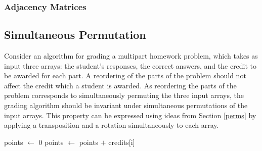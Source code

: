 \documentclass{llncs}
\DeclareMathOperator{\len}{length}
\begin{document}
\subsubsection{Adjacency Matrices}


\subsection{Simultaneous Permutation}

Consider an algorithm for grading a multipart homework problem, which takes as input three arrays:  the student's responses, the correct answers, and the credit to be awarded for each part.  A reordering of the parts of the problem should not affect the credit which a student is awarded.  As reordering the parts of the problem corresponds to simultaneously permuting the three input arrays, the grading algorithm should be invariant under simultaneous permutations of the input arrays.  This property can be expressed using ideas from Section \ref{perms} by applying a transposition and a rotation simultaneously to each array.%
%


\begin{algorithm}
\begin{algorithmic}
\State points \(\gets\) 0
\State points \(\gets\) points \(+\) credits[i]
\EndIf
\EndFor
{}
\EndFunction
\end{algorithmic}
\end{algorithm}
\end{document}
